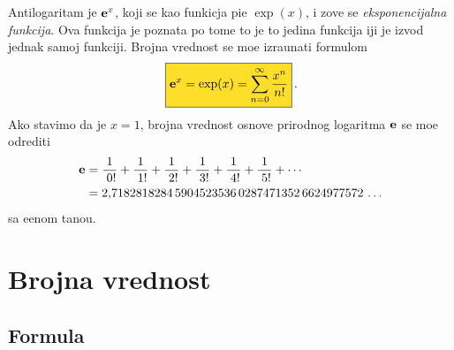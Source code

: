 \documentclass[12pt, twoside, a4paper]{article}
\def\.{{,}}
\def\e{{\bf e}}
\def\okvir#1{\,\fcolorbox{black}{Goldenrod}{$\displaystyle{\mathstrut #1}$}\,}
\begin{document}
\def\ep{\hphantom{!}}
\def\rf#1!{\frac1{\hphantom{!}#1!}}
Antilogaritam je $\e^x$, koji se kao funkicja pi{\sv}e $\exp(x)$, i zove se
{\sl eksponencijalna funkcija}. Ova funkcija je poznata po tome {\sv}to je to 
jedina funkcija {\cv}iji je izvod jednak samoj funkciji. Brojna vrednost se mo{\zv}e
izra{\cv}unati formulom
\begin{equation}
\label{eq:exp}
\okvir{\e^x=\exp(x)=\sum_{n=0}^\infty{x^n\over n!}}.
\end{equation}
Ako stavimo da je $x=1$,
brojna vrednost osnove prirodnog logaritma $\e$ se mo{\zv}e odrediti
\begin{equation}
\label{eq:e}
\begin{aligned}
\e
&=\rf0!+\rf1!+\rf2!+\rf3!+\rf4!+\rf5!+\cdots\\
&=2\.
7182818284\,
5904523536\,
0287471352\,
6624977572\,\ldots
\end{aligned}
\end{equation}
sa {\zv}e{\lj}enom ta{\cv}no{\sv}{\cc}u.


\section{Brojna vrednost}

\subsection{Formula}
\end{document}
